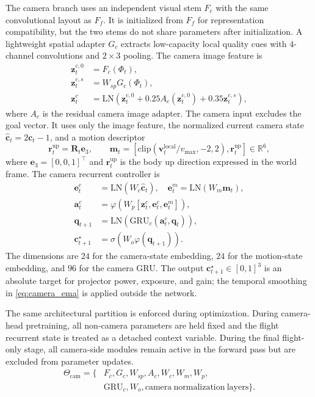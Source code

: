 \documentclass[letterpaper,journal]{IEEEtran}
\begin{document}
The camera branch uses an independent visual stem $F_c$ with the same
convolutional layout as $F_f$. It is initialized from $F_f$ for representation
compatibility, but the two stems do not share parameters after initialization.
A lightweight spatial adapter $G_c$ extracts low-capacity local quality cues
with $4$-channel convolutions and $2\times3$ pooling. The camera image feature
is
\begin{align}
    \mathbf{z}_t^{c,0}&=F_c(\Phi_t),\\
    \mathbf{z}_t^{c,s}&=W_{sp}G_c(\Phi_t),\\
    \mathbf{z}_t^c&=\mathrm{LN}\left(
    \mathbf{z}_t^{c,0}
    +0.25A_c(\mathbf{z}_t^{c,0})
    +0.35\mathbf{z}_t^{c,s}\right),
    \label{eq:camera_visual}
\end{align}
where $A_c$ is the residual camera image adapter. The camera input excludes the
goal vector. It uses only the image feature, the normalized current camera
state $\hat{\mathbf{c}}_t=2\mathbf{c}_t-1$, and a motion descriptor
\begin{equation}
    \mathbf{r}^{\mathrm{up}}_t=\mathbf{R}_t\mathbf{e}_3,\qquad
    \mathbf{m}_t=
    [\mathrm{clip}(\mathbf{v}^{\mathrm{local}}_t/v_{\max},-2,2),
    \mathbf{r}^{\mathrm{up}}_t]\in\mathbb{R}^{6},
    \label{eq:camera_motion_state}
\end{equation}
where $\mathbf{e}_3=[0,0,1]^\top$ and $\mathbf{r}^{\mathrm{up}}_t$ is the body
up direction expressed in the world frame. The camera recurrent controller is
\begin{align}
    \mathbf{e}_t^c&=\mathrm{LN}(W_c\hat{\mathbf{c}}_t),\quad
    \mathbf{e}_t^m=\mathrm{LN}(W_m\mathbf{m}_t),\\
    \mathbf{a}_t^c&=
    \varphi\left(W_p[\mathbf{z}_t^c,\mathbf{e}_t^c,\mathbf{e}_t^m]\right),\\
    \mathbf{q}_{t+1}&=\mathrm{LN}(\mathrm{GRU}_c(\mathbf{a}_t^c,\mathbf{q}_t)),\\
    \mathbf{c}_{t+1}^{\star}
    &=\sigma(W_o\varphi(\mathbf{q}_{t+1})).
    \label{eq:camera_head}
\end{align}
The dimensions are $24$ for the camera-state embedding, $24$ for the
motion-state embedding, and $96$ for the camera GRU. The output
$\mathbf{c}_{t+1}^{\star}\in[0,1]^3$ is an absolute target for projector
power, exposure, and gain; the temporal smoothing in \eqref{eq:camera_ema} is
applied outside the network.

The same architectural partition is enforced during optimization. During
camera-head pretraining, all non-camera parameters are held fixed and the
flight recurrent state is treated as a detached context variable. During the
final flight-only stage, all camera-side modules remain active in the forward
pass but are excluded from parameter updates.
\begin{equation}
\begin{aligned}
    \Theta_{\mathrm{cam}}=\{&
    F_c,G_c,W_{sp},A_c,W_c,W_m,W_p,\\
    &\mathrm{GRU}_c,W_o,\mathrm{camera\ normalization\ layers}\}.
    \label{eq:freeze_set}
\end{aligned}
\end{equation}
\end{document}

